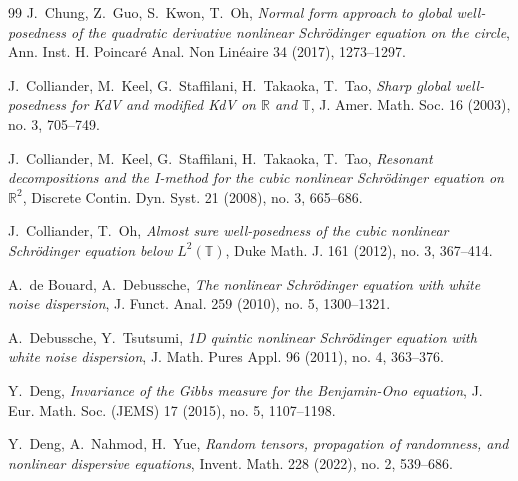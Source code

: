 \documentclass[letterpaper, 11pt,  reqno]{amsart}
\newcommand{\1}{\hspace{0.5mm}\text{I}\hspace{0.5mm}}
\newcommand{\R}{\mathbb{R}}
\newcommand{\T}{\mathbb{T}}
\numberwithin{equation}{section}
\numberwithin{theorem}{section}
\begin{document}
\begin{thebibliography}{99}
J.~Chung, Z.~Guo, S.~Kwon, T.~Oh, 
{\it  Normal form approach to global well-posedness of the quadratic derivative nonlinear Schr\"odinger equation on the circle}, Ann. Inst. H. Poincar\'e Anal. Non Lin\'eaire 34 (2017), 1273--1297. 





J.~Colliander, M.~Keel, G.~Staffilani, H.~Takaoka, T.~Tao,
{\it Sharp global well-posedness for KdV and modified KdV on $\R$ and $\T$},
J. Amer. Math. Soc. 16 (2003), no. 3, 705--749.




J.~Colliander, M.~Keel, G.~Staffilani, H.~Takaoka, T.~Tao,
{\it Resonant decompositions and the I-method for the cubic nonlinear Schr\"odinger equation on $\R^2$},  Discrete Contin. Dyn. Syst. 21 (2008), no. 3, 665--686. 

J.~Colliander, T.~Oh, 
{\it  Almost sure well-posedness of the cubic nonlinear Schr\"odinger equation below $L^2(\T)$}, 
Duke Math. J. 161 (2012), no. 3, 367--414. 



A.~de Bouard, A.~Debussche, 
{\it The nonlinear Schr\"odinger equation with white noise dispersion},
J. Funct. Anal. 259 (2010), no. 5, 1300--1321. 




% 
% 
% 
%
 

A.~Debussche, Y.~Tsutsumi, 
{\it 1D quintic nonlinear Schr\"odinger equation with white noise dispersion},
 J. Math. Pures Appl.  96 (2011), no. 4, 363--376. 


Y.~Deng,
{\it Invariance of the Gibbs measure for the Benjamin-Ono equation}, 
J. Eur. Math. Soc. (JEMS) 17 (2015), no. 5, 1107--1198.



   Y.~Deng, A.~Nahmod,  H.~Yue,
  {\it Random tensors, propagation of randomness, and
  nonlinear dispersive equations}, 
  Invent.
  Math. 228 (2022), no. 2, 539--686.




\end{thebibliography}
\end{document}
